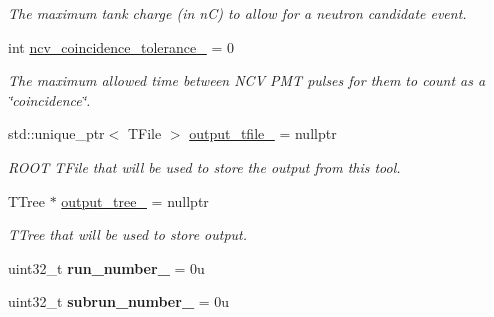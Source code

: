 \begin{DoxyCompactItemize}
\begin{DoxyCompactList}\small\item\em The maximum tank charge (in n\-C) to allow for a neutron candidate event. \end{DoxyCompactList}\item 
\hypertarget{classPhaseITreeMaker_a5487981246c33caa49c30aa09d6f9d98}{int \hyperlink{classPhaseITreeMaker_a5487981246c33caa49c30aa09d6f9d98}{ncv\-\_\-coincidence\-\_\-tolerance\-\_\-} = 0}\label{classPhaseITreeMaker_a5487981246c33caa49c30aa09d6f9d98}

\begin{DoxyCompactList}\small\item\em The maximum allowed time between N\-C\-V P\-M\-T pulses for them to count as a \char`\"{}coincidence\char`\"{}. \end{DoxyCompactList}\item 
\hypertarget{classPhaseITreeMaker_a67db041338ed358586fb935775b504aa}{std\-::unique\-\_\-ptr$<$ T\-File $>$ \hyperlink{classPhaseITreeMaker_a67db041338ed358586fb935775b504aa}{output\-\_\-tfile\-\_\-} = nullptr}\label{classPhaseITreeMaker_a67db041338ed358586fb935775b504aa}

\begin{DoxyCompactList}\small\item\em R\-O\-O\-T T\-File that will be used to store the output from this tool. \end{DoxyCompactList}\item 
\hypertarget{classPhaseITreeMaker_ac35cd1936f5733ef3c133058727875f4}{T\-Tree $\ast$ \hyperlink{classPhaseITreeMaker_ac35cd1936f5733ef3c133058727875f4}{output\-\_\-tree\-\_\-} = nullptr}\label{classPhaseITreeMaker_ac35cd1936f5733ef3c133058727875f4}

\begin{DoxyCompactList}\small\item\em T\-Tree that will be used to store output. \end{DoxyCompactList}\item 
\hypertarget{classPhaseITreeMaker_ad73a1ddf206e49fbca71fe62d495c69f}{uint32\-\_\-t {\bfseries run\-\_\-number\-\_\-} = 0u}\label{classPhaseITreeMaker_ad73a1ddf206e49fbca71fe62d495c69f}

\item 
\hypertarget{classPhaseITreeMaker_aec7329027d1c43d9ee16a7fcb96bdf17}{uint32\-\_\-t {\bfseries subrun\-\_\-number\-\_\-} = 0u}\label{classPhaseITreeMaker_aec7329027d1c43d9ee16a7fcb96bdf17}


\end{DoxyCompactItemize}
